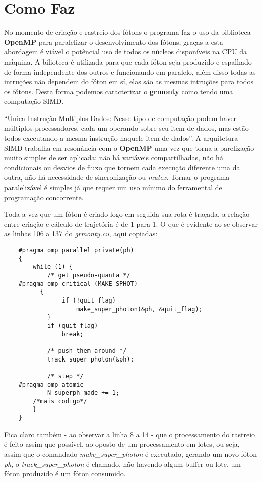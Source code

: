 \section{Como Faz}

  No momento de criação e rastreio dos fótons o programa faz o uso da biblioteca \textbf{OpenMP} para paralelizar o desenvolvimento dos fótons, graças a esta abordagem é viável o potêncial uso de todos os núcleos disponíveis na CPU da máquina. A bilioteca é utilizada para que cada fóton seja produzido e espalhado de forma independente dos outros e funcionando em paralelo, além disso todas as intruções não dependem do fóton em sí, elas são as mesmas intruções para todos os fótons. Desta forma podemos caracterizar o \textbf{grmonty} como tendo uma computação SIMD.

  ``Única Instrução Multiplos Dados: Nesse tipo de computação podem haver múltiplos processadores, cada um operando sobre seu item de dados, mas estão todos executando a mesma instrução naquele item de dados''\citep[p.84, traduzido]{HCP:16}. A arquitetura SIMD trabalha em resonância com o \textbf{OpenMP} uma vez que torna a parelização muito simples de ser aplicada: não há variáveis compartilhadas, não há condicionais ou desvios de fluxo que tornem cada execução diferente uma da outra, não há necessidade de sincronização ou \textit{mutex}. Tornar o programa paralelizável é simples já que requer um uso mínimo do ferramental de programação concorrente.


  Toda a vez que um fóton é criado logo em seguida sua rota é traçada, a relação entre criação e cálculo de trajetória é de 1 para 1. O que é evidente ao se observar as linhas 106 a 137 do \textit{grmonty.cu}, aqui copiadas:

  \begin{lstlisting}
    #pragma omp parallel private(ph)
  	{
  		while (1) {
  			/* get pseudo-quanta */
    #pragma omp critical (MAKE_SPHOT)
  		  {
  				if (!quit_flag)
  					make_super_photon(&ph, &quit_flag);
  			}
  			if (quit_flag)
  				break;

  			/* push them around */
  			track_super_photon(&ph);

  			/* step */
    #pragma omp atomic
  			N_superph_made += 1;
        /*mais codigo*/
  		}
  	}
  \end{lstlisting}

  Fica claro também - ao observar a linha 8 a 14 - que o processamento do rastreio é feito assim que possível, ao oposto de um processamento em lotes, ou seja, assim que o comandado \textit{make\_super\_photon} é executado, gerando um novo fóton \textit{ph}, o  \textit{track\_super\_photon} é chamado, não havendo algum buffer ou lote, um fóton produzido é um fóton consumido.

